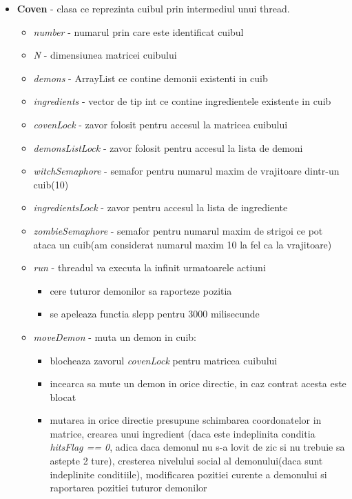 \documentclass{article}
\begin{document}
\begin{itemize}
\begin{itemize}
\begin{itemize}
              
               \end{itemize}
              \end{itemize}
        \item \textbf{Coven} - clasa ce reprezinta cuibul prin intermediul unui thread.
            \begin{itemize}
                \item \textit{number} - numarul prin care este identificat cuibul
                \item \textit{N} - dimensiunea matricei cuibului
                \item \textit{demons} - ArrayList ce contine demonii existenti in cuib
                \item \textit{ingredients} - vector de tip int ce contine ingredientele existente in cuib
                \item \textit{covenLock} -  zavor folosit pentru accesul la matricea cuibului
                \item \textit{demonsListLock} - zavor folosit pentru accesul la lista de demoni
                \item \textit{witchSemaphore} - semafor pentru numarul maxim de vrajitoare dintr-un cuib(10)
                \item \textit{ingredientsLock} - zavor pentru accesul la lista de ingrediente
                \item \textit{zombieSemaphore} - semafor pentru numarul maxim de strigoi ce pot ataca un cuib(am considerat numarul maxim 10 la fel ca la vrajitoare)
                \item \textit{run} - threadul va executa la infinit urmatoarele actiuni
                    \begin{itemize}
                        \item cere tuturor demonilor sa raporteze pozitia 
                        \item se apeleaza functia slepp pentru 3000 milisecunde
                    \end{itemize}
                \item \textit{moveDemon} - muta un demon in cuib:
                    \begin{itemize}
                        \item blocheaza zavorul \textit{covenLock} pentru matricea cuibului 
                        \item incearca sa mute un demon in orice directie, in caz contrat acesta este blocat
                        \item mutarea in orice directie presupune schimbarea coordonatelor in matrice,  crearea unui ingredient (daca este indeplinita conditia \textit{hitsFlag == 0}, adica daca demonul nu s-a lovit de zic si nu trebuie sa astepte 2 ture), cresterea nivelului social al demonului(daca sunt indeplinite conditiile), modificarea pozitiei curente a demonului si raportarea pozitiei tuturor demonilor

\end{itemize}
\end{itemize}
\end{itemize}
\end{document}
